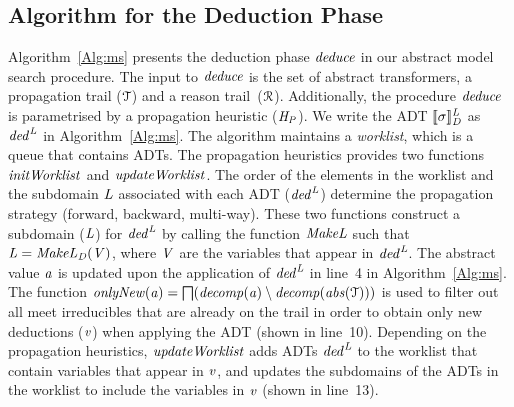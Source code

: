 \subsection{Algorithm for the Deduction Phase}
%
Algorithm~\ref{Alg:ms} presents the deduction phase $\mathit{deduce}$ in 
our abstract model search procedure.  The input to $\mathit{deduce}$ is 
the set of abstract transformers, a propagation trail ($\mathcal{T}$) 
and a reason trail~($\mathcal{R}$).  Additionally, the procedure 
$\mathit{deduce}$ is parametrised by a propagation heuristic ($\mathit{H_P}$). 
We write the ADT 
$\llbracket \sigma \rrbracket_{\mathit{D}}^{\mathit{L}}$
as $\mathit{ded}^{\mathit{L}}$ in Algorithm~\ref{Alg:ms}. 
%
The algorithm maintains a {\em worklist}, which is a queue that contains 
ADTs.  The propagation heuristics provides two 
functions $\mathit{initWorklist}$ and $\mathit{updateWorklist}$.
The order of the elements in the worklist and the subdomain $\mathit{L}$ 
associated with each ADT ($\mathit{ded}^{\mathit{L}}$) 
determine the propagation strategy (forward, backward, multi-way).
These two functions construct a subdomain ($\mathit{L}$)
for $\mathit{ded}^{\mathit{L}}$ 
by calling the function $\mathit{MakeL}$ such that 
$\mathit{L}=\mathit{MakeL}_{\mathit{D}}(\mathit{V})$, where $\mathit{V}$ are 
the variables that appear in $\mathit{ded}^{\mathit{L}}$. 
%
The abstract value $\mathit{a}$ is updated upon the application of 
$\mathit{ded}^{\mathit{L}}$ in line~4 in Algorithm~\ref{Alg:ms}. 
The function
$\mathit{onlyNew}(\mathit{a})=\bigsqcap({\mathit{decomp}}(\mathit{a})\setminus{\mathit{decomp}}(\mathit{abs}(\mathcal{T})))$
is used to filter out all meet irreducibles that are already on the trail
in order to obtain only new deductions ($\mathit{v}$) when applying 
the ADT (shown in line~10).
%
Depending on the propagation heuristics, $\mathit{updateWorklist}$ adds
ADTs $\mathit{ded}^{\mathit{L}}$ to the 
worklist that contain variables that appear in $\mathit{v}$, and 
updates the subdomains of the ADTs in the worklist 
to include the variables in $\mathit{v}$ (shown in line~13).
%
%

